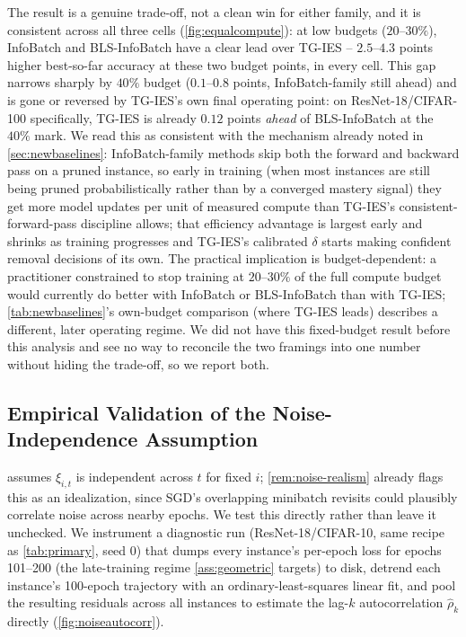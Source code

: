 \documentclass{article}
\theoremstyle{plain}
\theoremstyle{definition}
\theoremstyle{remark}
\begin{document}
The result is a genuine trade-off, not a clean win for either family, and it is consistent across all three cells (\cref{fig:equalcompute}): at low budgets ($20$--$30\%$), InfoBatch and BLS-InfoBatch have a clear lead over TG-IES -- $2.5$--$4.3$ points higher best-so-far accuracy at these two budget points, in every cell. This gap narrows sharply by $40\%$ budget ($0.1$--$0.8$ points, InfoBatch-family still ahead) and is gone or reversed by TG-IES's own final operating point: on ResNet-18/CIFAR-100 specifically, TG-IES is already $0.12$ points \emph{ahead} of BLS-InfoBatch at the $40\%$ mark. We read this as consistent with the mechanism already noted in \cref{sec:newbaselines}: InfoBatch-family methods skip both the forward and backward pass on a pruned instance, so early in training (when most instances are still being pruned probabilistically rather than by a converged mastery signal) they get more model updates per unit of measured compute than TG-IES's consistent-forward-pass discipline allows; that efficiency advantage is largest early and shrinks as training progresses and TG-IES's calibrated $\delta$ starts making confident removal decisions of its own. The practical implication is budget-dependent: a practitioner constrained to stop training at $20$--$30\%$ of the full compute budget would currently do better with InfoBatch or BLS-InfoBatch than with TG-IES; \cref{tab:newbaselines}'s own-budget comparison (where TG-IES leads) describes a different, later operating regime. We did not have this fixed-budget result before this analysis and see no way to reconcile the two framings into one number without hiding the trade-off, so we report both.

\subsection{Empirical Validation of the Noise-Independence Assumption}
\label{sec:noise-validation}

 assumes $\xi_{i,t}$ is independent across $t$ for fixed $i$; \cref{rem:noise-realism} already flags this as an idealization, since SGD's overlapping minibatch revisits could plausibly correlate noise across nearby epochs. We test this directly rather than leave it unchecked. We instrument a diagnostic run (ResNet-18/CIFAR-10, same recipe as \cref{tab:primary}, seed 0) that dumps every instance's per-epoch loss for epochs 101--200 (the late-training regime \cref{ass:geometric} targets) to disk, detrend each instance's 100-epoch trajectory with an ordinary-least-squares linear fit, and pool the resulting residuals across all instances to estimate the lag-$k$ autocorrelation $\hat\rho_k$ directly (\cref{fig:noiseautocorr}).
\end{document}
